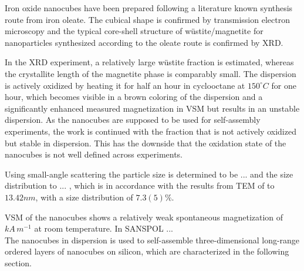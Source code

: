 \documentclass[\main/dresen_thesis.tex]{subfiles}
\begin{document}
  Iron oxide nanocubes have been prepared following a literature known synthesis route from iron oleate.
  The cubical shape is confirmed by transmission electron microscopy and the typical core-shell structure of w\"ustite/magnetite for nanoparticles synthesized according to the oleate route is confirmed by XRD.

  In the XRD experiment, a relatively large w\"ustite fraction is estimated, whereas the crystallite length of the magnetite phase is comparably small.
  The dispersion is actively oxidized by heating it for half an hour in cyclooctane at $150 ^\circ C$ for one hour, which becomes visible in a brown coloring of the dispersion and a significantly enhanced measured magnetization in VSM but results in an unstable dispersion.
  As the nanocubes are supposed to be used for self-assembly experiments, the work is continued with the fraction that is not actively oxidized but stable in dispersion.
  This has the downside that the oxidation state of the nanocubes is not well defined across experiments.

  Using small-angle scattering the particle size is determined to be ... and the size distribution to ... , which is in accordance with the results from TEM of to $13.42 \unit{nm}$, with a size distribution of $7.3(5) \%$.

  VSM of the nanocubes shows a relatively weak spontaneous magnetization of $ \unit{kA \, m^{-1}}$ at room temperature.
  In SANSPOL ...
  \\

  The nanocubes in dispersion is used to self-assemble three-dimensional long-range ordered layers of nanocubes on silicon, which are characterized in the following section.
\end{document}
